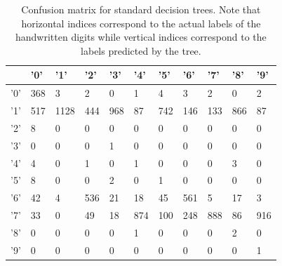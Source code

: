 \begin{table}
	\begin{tabular}{l|llllllllll}
		&   '0' &   '1' &   '2' &   '3' &   '4' &   '5' &   '6' &   '7' &   '8' &   '9' \\
		\hline
		'0' &   368 &     3 &     2 &     0 &     1 &     4 &     3 &     2 &     0 &     2 \\
		'1' &   517 &  1128 &   444 &   968 &    87 &   742 &   146 &   133 &   866 &    87 \\
		'2' &     8 &     0 &     0 &     0 &     0 &     0 &     0 &     0 &     0 &     0 \\
		'3' &     0 &     0 &     0 &     1 &     0 &     0 &     0 &     0 &     0 &     0 \\
		'4' &     4 &     0 &     1 &     0 &     1 &     0 &     0 &     0 &     3 &     0 \\
		'5' &     8 &     0 &     0 &     2 &     0 &     1 &     0 &     0 &     0 &     0 \\
		'6' &    42 &     4 &   536 &    21 &    18 &    45 &   561 &     5 &    17 &     3 \\
		'7' &    33 &     0 &    49 &    18 &   874 &   100 &   248 &   888 &    86 &   916 \\
		'8' &     0 &     0 &     0 &     0 &     1 &     0 &     0 &     0 &     2 &     0 \\
		'9' &     0 &     0 &     0 &     0 &     0 &     0 &     0 &     0 &     0 &     1 \\
	\end{tabular}
	\caption{Confusion matrix for standard decision trees.  Note that horizontal indices correspond to the actual labels of the handwritten digits while vertical indices correspond to the labels predicted by the tree.}
	\label{table:no_kd_confusion}
\end{table}
